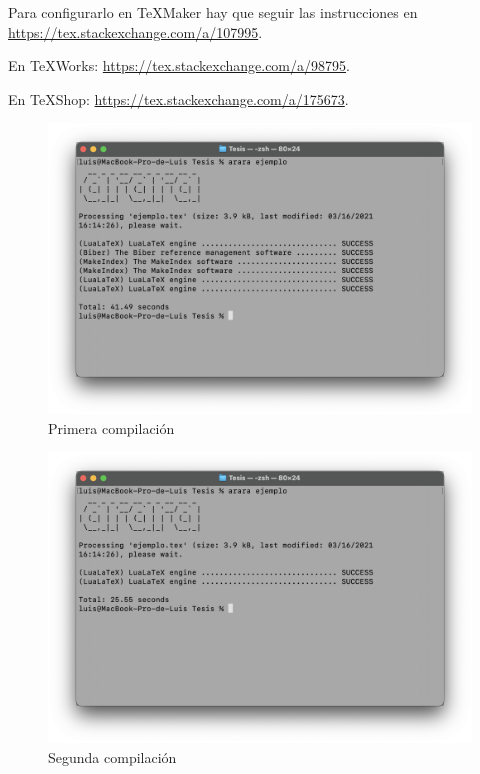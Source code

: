 Para configurarlo en TeXMaker hay que seguir las instrucciones en
\url{https://tex.stackexchange.com/a/107995}.

En TeXWorks: \url{https://tex.stackexchange.com/a/98795}.

En TeXShop: \url{https://tex.stackexchange.com/a/175673}.

\clearpage

\begin{figure}
\centering
  \includegraphics[scale=0.3]{primera}
  \caption{Primera compilación}
\end{figure}

\begin{figure}
\centering
  \includegraphics[scale=0.3]{segunda}
  \caption{Segunda compilación}
\end{figure}
